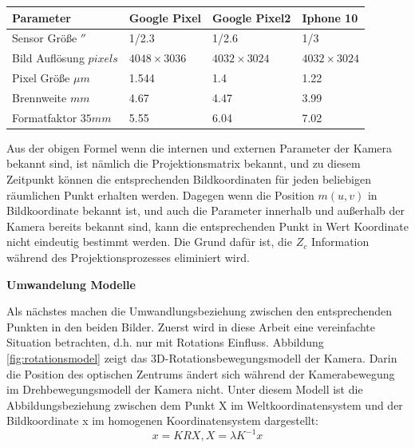 \begin{table}[htb]
	\label{tbl:params}
	\footnotesize
	\centering
	\begin{tabular}{|p{3cm}|p{2.5cm}|p{2.5cm}|p{2.5cm}|}	%
	\toprule
	\textbf{Parameter} & \textbf{Google Pixel} & \textbf{Google Pixel2} & \textbf{Iphone 10}\\
	\midrule
	Sensor Größe $''$ & 1/2.3 & 1/2.6 & 1/3 \\
	Bild Auflösung $pixels$ & $4048 \times 3036$ & $4032 \times 3024$ & $4032 \times 3024$ \\
	Pixel Größe $\mu m$ & 1.544 & 1.4 & 1.22 \\	
	Brennweite $mm$ & 4.67 & 4.47 & 3.99 \\
	Formatfaktor $35 mm$  	&5.55	&6.04	&7.02	\\
	
	\bottomrule
	\end{tabular}
\end{table} 



Aus der obigen Formel wenn die internen und externen Parameter der Kamera bekannt sind, ist nämlich die Projektionsmatrix bekannt, und zu diesem Zeitpunkt können die entsprechenden Bildkoordinaten für jeden beliebigen räumlichen Punkt erhalten werden. Dagegen  wenn die Position $m(u,v)$ in Bildkoordinate bekannt ist, und auch die Parameter innerhalb und außerhalb der Kamera bereits bekannt sind, kann die entsprechenden Punkt in Wert Koordinate nicht eindeutig bestimmt werden. Die Grund dafür ist, die $Z_c$ Information während des Projektionsprozesses eliminiert wird. 

\textbf{Umwandelung  Modelle}

Als nächstes machen die Umwandlungsbeziehung zwischen den entsprechenden Punkten in den beiden Bilder.
Zuerst wird in diese Arbeit eine vereinfachte Situation  betrachten, d.h. nur mit Rotations Einfluss. Abbildung \ref{fig:rotationsmodel} zeigt das 3D-Rotationsbewegungsmodell der Kamera. Darin die Position des optischen Zentrums ändert sich während der Kamerabewegung im Drehbewegungsmodell der Kamera nicht. Unter diesem Modell ist die Abbildungsbeziehung zwischen dem Punkt X im Weltkoordinatensystem und der Bildkoordinate x im homogenen Koordinatensystem dargestellt: 
\begin{equation}
   x = KRX, X = \lambda  K^{-1} x
\end{equation}

